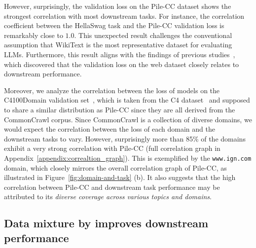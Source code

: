 However, surprisingly, the validation loss on the Pile-CC dataset shows the strongest correlation with most downstream tasks. For instance, the correlation coefficient between the HellaSwag task and the Pile-CC validation loss is remarkably close to $1.0$.
This unexpected result challenges the conventional assumption that WikiText is the most representative dataset for evaluating LLMs.
Furthermore, this result aligns with the findings of previous studies~\citep{gadre2024language, huang2024compression}, which discovered that the validation loss on the web dataset closely relates to downstream performance. 

Moreover, we analyze the correlation between the loss of models on the C4100Domain validation set~\citep{paloma2023allen}, which is taken from the C4 dataset~\citep{2019t5} and supposed to share a similar distribution as Pile-CC since they are all derived from the CommonCrawl corpus. Since CommonCrawl is a collection of diverse domains, we would expect the correlation between the loss of each domain and the downstream tasks to vary. However, surprisingly more than 85\% of the domains exhibit a very strong correlation with Pile-CC (full correlation graph in Appendix~\ref{appendix:correaltion_graph}).
This is exemplified by the \texttt{www.ign.com} domain, which closely mirrors the overall correlation graph of Pile-CC, as illustrated in Figure~\ref{fig:domain-and-task} (b).
It also suggests that the high correlation between Pile-CC and downstream task performance may be attributed to its \textit{diverse coverage across various topics and domains}.

\subsection{Data mixture by \ourmethod improves downstream performance}
\label{sec:no_pile_exper}


